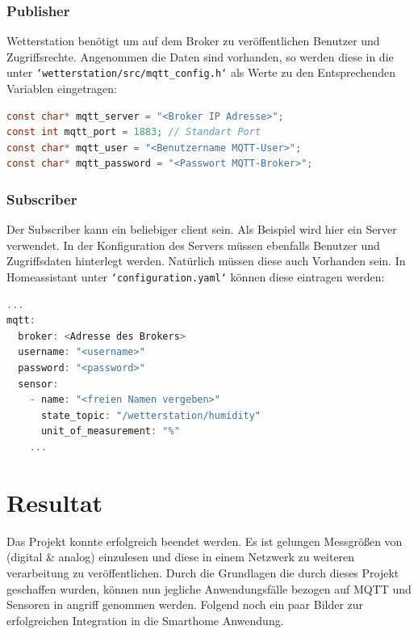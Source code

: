 \documentclass[a4paper, 11pt]{article}
\begin{document}
\subsubsection{Publisher}
Wetterstation benötigt um auf dem Broker zu veröffentlichen
Benutzer und Zugriffsrechte.
Angenommen die Daten sind vorhanden, so werden diese in die unter
\texttt{`wetterstation/src/mqtt\_config.h`} als Werte zu den Entsprechenden
Variablen eingetragen:

\begin{lstlisting}[language=C, style=code]
const char* mqtt_server = "<Broker IP Adresse>";
const int mqtt_port = 1883; // Standart Port
const char* mqtt_user = "<Benutzername MQTT-User>";
const char* mqtt_password = "<Passwort MQTT-Broker>";
\end{lstlisting}

\subsubsection{Subscriber}
Der Subscriber kann ein beliebiger client sein. Als Beispiel wird hier ein
Server verwendet. In der Konfiguration des Servers müssen ebenfalls Benutzer und
Zugriffsdaten hinterlegt werden. Natürlich müssen diese auch Vorhanden sein.
In Homeassistant unter \texttt{`configuration.yaml`} können diese eintragen werden:

\begin{lstlisting}[language=C, style=code]
...
mqtt:
  broker: <Adresse des Brokers>
  username: "<username>"
  password: "<password>"
  sensor:
    - name: "<freien Namen vergeben>"
      state_topic: "/wetterstation/humidity"
      unit_of_measurement: "%"
    ...
\end{lstlisting}

\section{Resultat}
Das Projekt konnte erfolgreich beendet werden. Es ist gelungen Messgrößen von
(digital \& analog) einzulesen und diese in einem Netzwerk zu weiteren
verarbeitung zu veröffentlichen. Durch die Grundlagen die durch dieses Projekt
geschaffen wurden, können nun jegliche Anwendungsfälle bezogen auf MQTT und
Sensoren in angriff genommen werden.
Folgend noch ein paar Bilder zur erfolgreichen Integration in die Smarthome
Anwendung.
\end{document}
